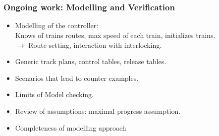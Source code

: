 \documentclass{beamer}
\begin{document}
\section{}


\begin{frame}
\frametitle{Ongoing work: Modelling and Verification}
\begin{itemize}
\item Modelling of  the controller: \\
Knows of trains routes, max speed of each train, initializes trains.\\
$\to $ Route setting, interaction with interlocking.\\


\bigskip
\item Generic track plans, control tables, release tables. 



\bigskip

\item Scenarios that lead to counter examples.

\bigskip
\item Limits of Model checking.

\bigskip

\item Review of assumptions: maximal progress assumption.

\bigskip

\item Completeness of modelling approach
\end{itemize}

\end{frame}





\end{document}
